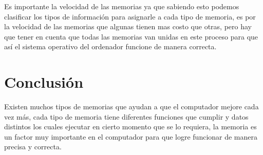 \documentclass{article}
\begin{document}
Es importante la velocidad de las memorias ya que sabiendo esto podemos clasificar los tipos de información para asignarle a cada tipo de memoria, es por la velocidad de las memorias que algunas tienen mas costo que otras, pero hay que tener en cuenta que todas las memorias van unidas en este proceso para que así el sistema operativo del ordenador funcione de manera correcta. 
\newpage
\section{Conclusión} \label{conclusion}
Existen muchos tipos de memorias que ayudan a que el computador mejore cada vez más, cada tipo de memoria tiene diferentes funciones que cumplir y datos distintos los cuales ejecutar en cierto momento que se lo requiera, la memoria es un factor muy importante en el computador para que logre funcionar de manera precisa y correcta.
\newpage


\end{document}
